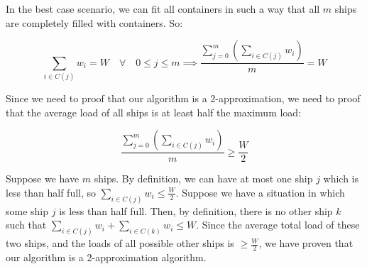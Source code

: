 \documentclass{article}
\renewcommand{\leq}{\leqslant}
\renewcommand{\geq}{\geqslant}
\newcounter{rcounter}
\newenvironment{rlist}%
{\begin{list}{\setnr-\arabic{rcounter}}{\usecounter{rcounter}}}{\end{list}}
\begin{document}
\begin{rlist}
\begin{enumerate}
            In the best case scenario, we can fit all containers in such a way that all $m$ ships are completely filled with containers. So:
            
            $$\sum_{i \in C(j)} w_i = W \quad \forall \quad 0 \leq j \leq m \implies \frac{\sum_{j=0}^m\left(\sum_{i \in C(j)} w_i\right)}{m} = W$$
            
            Since we need to proof that our algorithm is a 2-approximation, we need to proof that the average load of all ships is at least half the maximum load:
            
            $$\frac{\sum_{j=0}^m\left(\sum_{i \in C(j)} w_i\right)}{m} \geq \frac{W}{2}$$
            
            Suppose we have $m$ ships. By definition, we can have at most one ship $j$ which is less than half full, so $\sum_{i \in C(j)} w_i \leq \frac{W}{2}$. Suppose we have a situation in which some ship $j$ is less than half full. Then, by definition, there is no other ship $k$ such that $\sum_{i \in C(j)} w_i + \sum_{i \in C(k)} w_i\leq W$. Since the average total load of these two ships, and the loads of all possible other ships is $\geq \frac{W}{2}$, we have proven that our algorithm is a 2-approximation algorithm.
        \end{enumerate}
    \end{rlist}
    
    \renewcommand{\setnr}{A.II}
\end{document}
